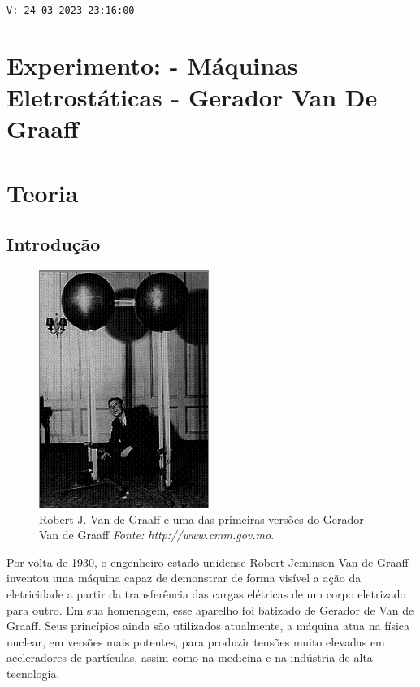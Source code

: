 \noindent \texttt{V: 24-03-2023 23:16:00}

\section*{Experimento: - Máquinas Eletrostáticas - Gerador Van De Graaff}

\section*{Teoria}
\subsection*{Introdução}

\begin{figure}
\centering
\includegraphics[width=0.7\linewidth]{img/rj-vandegraaff.png} 
	\caption{Robert J. Van de Graaff e uma das primeiras versões do Gerador Van de Graaff \textit{Fonte: http://www.cmm.gov.mo}.}
	\label{fig:robert-j-vgraaff}
\end{figure}
Por volta de 1930, o engenheiro estado-unidense Robert Jeminson Van de Graaff inventou uma 
máquina capaz de demonstrar de forma visível a ação da eletricidade a partir da transferência das 
cargas elétricas de um corpo eletrizado para outro. Em sua homenagem, esse aparelho foi batizado
de Gerador de Van de Graaff. Seus princípios ainda são utilizados atualmente, a máquina atua na 
física nuclear, em versões mais potentes, para produzir tensões muito elevadas em aceleradores de 
partículas, assim como na medicina e na indústria de alta tecnologia.

